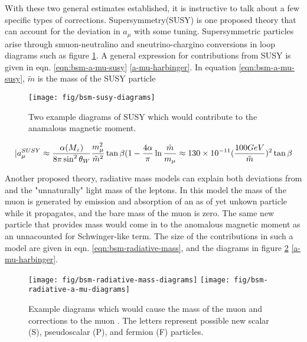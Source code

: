 With these two general estimates established, it is instructive to talk about a few specific types of corrections.  Supersymmetry(SUSY) is one proposed theory that can account for the deviation in $a_\mu$ with some tuning.  Supersymmetric particles arise through smuon-neutralino and sneutrino-chargino conversions in loop diagrams such as figure \ref{fig:bsm-susy-diagrams}.  A general expression for contributions from SUSY is given in eqn. \ref{eqn:bsm-a-mu-susy} \ref{a-mu-harbinger}.  In equation \ref{eqn:bsm-a-mu-susy}, $\tilde{m}$ is the mass of the SUSY particle

\begin{figure}
\label{fig:bsm-susy-diagrams}
\texttt{[image: fig/bsm-susy-diagrams]}
\caption{Two example diagrams of SUSY which would contribute to the anamalous magnetic moment.}
\end{figure}

\begin{equation}
\label{eqn:bsm-a-mu-susy}
|a_\mu^{SUSY} \approx \frac{\alpha(M_z)}{8 \pi \sin^2{\theta_W}} \\
\frac{m_\mu^2}{\tilde{m}^2} \tan{\beta} \\
(1 - \frac{4\alpha}{\pi}\ln{\frac{\tilde{m}}{m_\mu}} \\
\approx 130 \times 10^{-11} (\frac{100 GeV}{\tilde{m}})^2 \tan{\beta}
\end{equation}

Another proposed theory, radiative mass models can explain both deviations from \gmtwo and the "unnaturally" light mass of the leptons.  In this model the mass of the muon is generated by emission and absorption of an as of yet unkown particle while it propagates, and the bare mass of the muon is zero.  The same new particle that provides mass would come in to the anomalous magnetic moment as an unnacounted for Schwinger-like term.  The size of the contributions in such a model are given in eqn. \ref{eqn:bsm-radiative-mass}, and the diagrams in figure \ref{fig:bsm-radiative-diagrams} \ref{a-mu-harbinger}.

\begin{figure}
\label{fig:bsm-radiative-diagrams}
\texttt{[image: fig/bsm-radiative-mass-diagrams]}
\texttt{[image: fig/bsm-radiative-a-mu-diagrams]}
\caption{Example diagrams which would cause the mass of the muon and corrections to the muon \gmtwo.  The letters represent possible new scalar (S), pseudoscalar (P), and fermion (F) particles.}
\end{figure}


